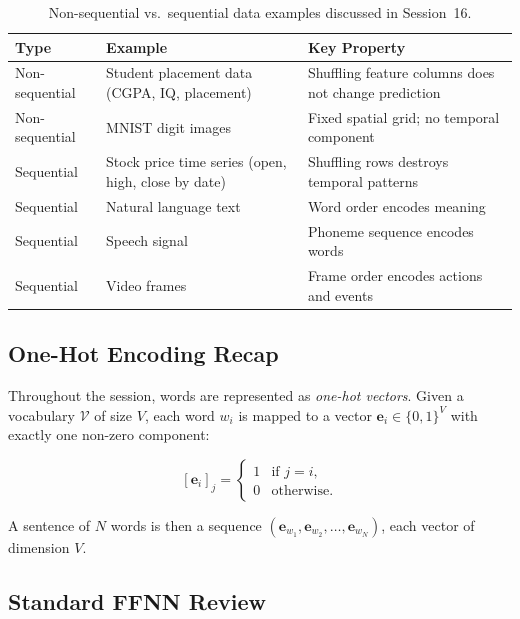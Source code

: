 \documentclass[12pt,a4paper]{article}
\begin{document}
\begin{table}[ht]
  \centering
  \caption{Non-sequential vs.\ sequential data examples discussed in Session~16.}
  \label{tab:data_types}
  \begin{tabularx}{\linewidth}{lXX}
    \toprule
    \textbf{Type} & \textbf{Example} & \textbf{Key Property} \\
    \midrule
    Non-sequential & Student placement data (CGPA, IQ, placement) &
      Shuffling feature columns does not change prediction \\
    Non-sequential & MNIST digit images &
      Fixed spatial grid; no temporal component \\
    Sequential & Stock price time series (open, high, close by date) &
      Shuffling rows destroys temporal patterns \\
    Sequential & Natural language text &
      Word order encodes meaning \\
    Sequential & Speech signal &
      Phoneme sequence encodes words \\
    Sequential & Video frames &
      Frame order encodes actions and events \\
    \bottomrule
  \end{tabularx}
\end{table}

\subsection{One-Hot Encoding Recap}
\label{subsec:onehot}

Throughout the session, words are represented as \emph{one-hot vectors}.
Given a vocabulary $\mathcal{V}$ of size $V$, each word $w_i$ is mapped to a
vector $\mathbf{e}_i \in \{0,1\}^{V}$ with exactly one non-zero component:

\begin{equation}
  \label{eq:onehot}
  [\mathbf{e}_i]_j =
  \begin{cases}
    1 & \text{if } j = i, \\
    0 & \text{otherwise.}
  \end{cases}
\end{equation}

A sentence of $N$ words is then a sequence
$(\mathbf{e}_{w_1}, \mathbf{e}_{w_2}, \ldots, \mathbf{e}_{w_N})$, each
vector of dimension $V$.

\subsection{Standard FFNN Review}
\label{subsec:ffnn_review}
\end{document}
